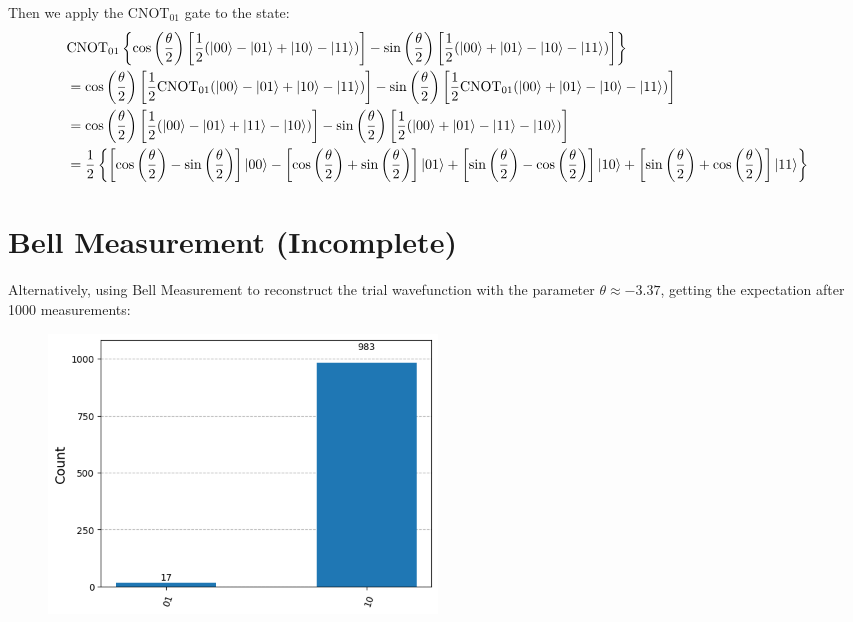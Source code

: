 \documentclass{article}
\begin{document}
Then we apply the \(\text{CNOT}_{01}\) gate to the state:
\begin{align*}
	 & \text{CNOT}_{01} \left\{\cos\left(\frac{\theta}{2}\right)\left[\frac{1}{2}(|00\rangle - |01\rangle + |10\rangle - |11\rangle)\right] - \sin\left(\frac{\theta}{2}\right)\left[\frac{1}{2}(|00\rangle + |01\rangle - |10\rangle - |11\rangle)\right]\right\} \\
	 &= \cos\left(\frac{\theta}{2}\right)\left[\frac{1}{2}\text{CNOT}_{01}(|00\rangle - |01\rangle + |10\rangle - |11\rangle)\right] - \sin\left(\frac{\theta}{2}\right)\left[\frac{1}{2}\text{CNOT}_{01}(|00\rangle + |01\rangle - |10\rangle - |11\rangle)\right] \\
	 &= \cos\left(\frac{\theta}{2}\right)\left[\frac{1}{2}(|00\rangle - |01\rangle + |11\rangle - |10\rangle)\right] - \sin\left(\frac{\theta}{2}\right)\left[\frac{1}{2}(|00\rangle + |01\rangle - |11\rangle - |10\rangle)\right]\\
	 & = \frac{1}{2}\left\{\left[\cos\left(\frac{\theta}{2}\right) - \sin\left(\frac{\theta}{2}\right)\right]\ket{00} - \left[\cos\left(\frac{\theta}{2}\right) + \sin\left(\frac{\theta}{2}\right)\right] \ket{01} + \left[\sin\left(\frac{\theta}{2}\right) - \cos\left(\frac{\theta}{2}\right)\right] \ket{10} 
											+ \left[\sin\left(\frac{\theta}{2}\right)+ \cos\left(\frac{\theta}{2}\right) \right]\ket{11} \right\}
\end{align*}


\section{Bell Measurement (Incomplete)}
Alternatively, using Bell Measurement to reconstruct the trial wavefunction with the parameter \(\theta \approx -3.37\), getting the expectation after 1000 measurements:
\begin{figure}[H]
	\centering
	\includegraphics[width=0.5\textwidth, height=0.3\textheight]{1000.png}
\end{figure}
\end{document}
